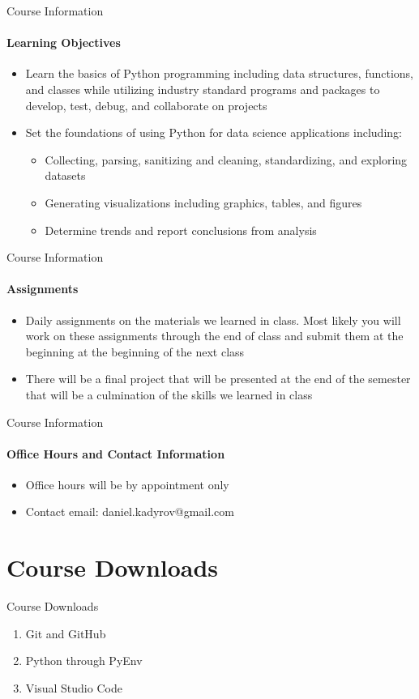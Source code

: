 \documentclass[
    aspectratio=169, 
    usepdftitle=false, 
    xcolor={dvipsnames},
    hyperref={
        colorlinks,
        linkcolor=black,
        urlcolor=blue}
    ]{beamer}
\begin{document}
\begin{frame}{Course Information}
    \framesubtitle{Learning Objectives}
    \begin{itemize}
        \item Learn the basics of Python programming including data structures, functions, and classes while utilizing industry standard programs and packages to develop, test, debug, and collaborate on projects
        \item Set the foundations of using Python for data science applications including:
        \begin{itemize}
            \item Collecting, parsing, sanitizing and cleaning, standardizing, and exploring datasets
            \item Generating visualizations including graphics, tables, and figures
            \item Determine trends and report conclusions from analysis
        \end{itemize}
    \end{itemize}
\end{frame}

\begin{frame}{Course Information}
    \framesubtitle{Assignments}
    \begin{itemize}
        \item Daily assignments on the materials we learned in class. Most likely you will work on these assignments through the end of class and submit them at the beginning at the beginning of the next class
        \item There will be a final project that will be presented at the end of the semester that will be a culmination of the skills we learned in class
    \end{itemize}
\end{frame}

\begin{frame}{Course Information}
    \framesubtitle{Office Hours and Contact Information}
    \begin{itemize}
        \item Office hours will be by appointment only
        \item Contact email: daniel.kadyrov@gmail.com
    \end{itemize}
\end{frame}

\section{Course Downloads}
\begin{frame}{Course Downloads}
\begin{enumerate}
    \item Git and GitHub
    \item Python through PyEnv
    \item Visual Studio Code
\end{enumerate}
\end{frame}
\end{document}
